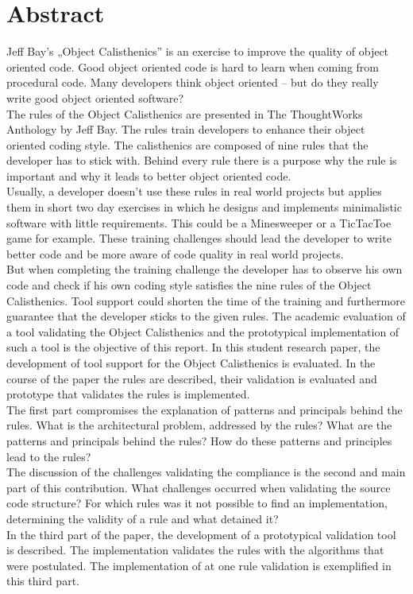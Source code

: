 \chapter*{Abstract} %
Jeff Bay’s „Object Calisthenics” is an exercise to improve the quality of object oriented code. Good object oriented code is hard to learn when coming from procedural code. Many developers think object oriented – but do they really write good object oriented software?
\\

The rules of the Object Calisthenics are presented in The ThoughtWorks Anthology by Jeff Bay. The rules train developers to enhance their object oriented coding style. The calisthenics are composed of nine rules that the developer has to stick with. Behind every rule there is a purpose why the rule is important and why it leads to better object oriented code.
\\

Usually, a developer doesn’t use these rules in real world projects but applies them in short two day exercises in which he designs and implements minimalistic software with little requirements. This could be a Minesweeper or a TicTacToe game for example. These training challenges should lead the developer to write better code and be more aware of code quality in real world projects.
\\

But when completing the training challenge the developer has to observe his own code and check if his own coding style satisfies the nine rules of the Object Calisthenics. Tool support could shorten the time of the training and furthermore guarantee that the developer sticks to the given rules.
The academic evaluation of a tool validating the Object Calisthenics and the prototypical implementation of such a tool is the objective of this report.
In this student research paper, the development of tool support for the Object Calisthenics is evaluated. In the course of the paper the rules are described, their validation is evaluated and prototype that validates the rules is implemented.
\\

The first part compromises the explanation of patterns and principals behind the rules. What is the architectural problem, addressed by the rules? What are the patterns and principals behind the rules? How do these patterns and principles lead to the rules?
\\

The discussion of the challenges validating the compliance is the second and main part of this contribution. What challenges occurred when validating the source code structure? For which rules was it not possible to find an implementation, determining the validity of a rule and what detained it? 
\\

In the third part of the paper, the development of a prototypical validation tool is described. The implementation validates the rules with the algorithms that were postulated. The implementation of at one rule validation is exemplified in this third part.